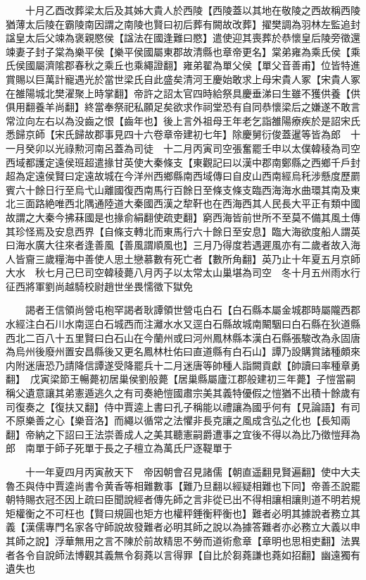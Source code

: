 　　十月乙酉改葬梁太后及其姊大貴人於西陵【西陵蓋以其地在敬陵之西故稱西陵猶薄太后陵在霸陵南因謂之南陵也賢曰初后葬有闕故改葬】擢樊調為羽林左監追封諡皇太后父竦為褒親愍侯【諡法在國逢難曰愍】遣使迎其喪葬於恭懷皇后陵旁徵還竦妻子封子棠為樂平侯【樂平侯國屬東郡故清縣也章帝更名】棠弟雍為乘氏侯【乘氏侯國屬濟隂郡春秋之乘丘也乘繩證翻】雍弟翟為單父侯【單父音善甫】位皆特進賞賜以巨萬計寵遇光於當世梁氏自此盛矣清河王慶始敢求上母宋貴人冢【宋貴人冢在雒陽城北樊濯聚上時掌翻】帝許之詔太官四時給祭具慶垂涕曰生雖不獲供養【供俱用翻養羊尚翻】終當奉祭祀私願足矣欲求作祠堂恐有自同恭懷梁后之嫌遂不敢言常泣向左右以為没齒之恨【齒年也】後上言外祖母王年老乞詣雒陽療疾於是詔宋氏悉歸京師【宋氏歸故郡事見四十六卷章帝建初七年】除慶舅衍俊蓋暹等皆為郎　十一月癸卯以光祿勲河南呂蓋為司徒　十二月丙寅司空張奮罷壬申以太僕韓稜為司空　西域都護定遠侯班超遣掾甘英使大秦條支【東觀記曰以漢中郡南鄭縣之西鄉千戶封超為定遠侯賢曰定遠故城在今洋州西鄉縣南西域傳曰自皮山西南經烏秅涉懸度歷罽賓六十餘日行至烏弋山離國復西南馬行百餘日至條支條支臨西海海水曲環其南及東北三面路絶唯西北隅通陸道大秦國西漢之犂靬也在西海西其人民長大平正有類中國故謂之大秦今拂菻國是也掾俞絹翻使疏吏翻】窮西海皆前世所不至莫不備其風土傳其珍怪焉及安息西界【自條支轉北而東馬行六十餘日至安息】臨大海欲度船人謂英曰海水廣大往來者逢善風【善風謂順風也】三月乃得度若遇遲風亦有二歲者故入海人皆齎三歲糧海中善使人思土戀慕數有死亡者【數所角翻】英乃止十年夏五月京師大水　秋七月己巳司空韓稜薨八月丙子以太常太山巢堪為司空　冬十月五州雨水行征西將軍劉尚越騎校尉趙世坐畏懦徵下獄免

　　謁者王信領尚營屯枹罕謁者耿譚領世營屯白石【白石縣本屬金城郡時屬隴西郡水經注白石川水南逕白石城西而注灕水水又逕白石縣故城南闞駰曰白石縣在狄道縣西北二百八十五里賢曰白石山在今蘭州或曰河州鳳林縣本漢白石縣張駿改為永固唐為烏州後廢州置安昌縣後又更名鳳林杜佑曰直道縣有白石山】譚乃設購賞諸種頗來内附迷唐恐乃請降信譚遂受降罷兵十二月迷唐等帥種人詣闕貢獻【帥讀曰率種章勇翻】　戊寅梁節王暢薨初居巢侯劉般薨【居巢縣屬廬江郡般建初三年薨】子愷當嗣稱父遺意讓其弟憲遁逃久之有司奏絶愷國肅宗美其義特優假之愷猶不出積十餘歲有司復奏之【復扶又翻】侍中賈逵上書曰孔子稱能以禮讓為國乎何有【見論語】有司不原樂善之心【樂音洛】而繩以循常之法懼非長克讓之風成含弘之化也【長知兩翻】帝納之下詔曰王法崇善成人之美其聽憲嗣爵遭事之宜後不得以為比乃徵愷拜為郎　南單于師子死單于長之子檀立為萬氏尸逐鞮單于

　　十一年夏四月丙寅赦天下　帝因朝會召見諸儒【朝直遥翻見賢遍翻】使中大夫魯丕與侍中賈逵尚書令黄香等相難數事【難乃旦翻以經疑相難也下同】帝善丕說罷朝特賜衣冠丕因上疏曰臣聞說經者傳先師之言非從已出不得相讓相讓則道不明若規矩權衡之不可枉也【賢曰規圓也矩方也權秤錘衡秤衡也】難者必明其據說者務立其義【漢儒專門名家各守師說故發難者必明其師之說以為據答難者亦必務立大義以申其師之說】浮華無用之言不陳於前故精思不勞而道術愈章【章明也思相吏翻】法異者各令自說師法博觀其義無令芻蕘以言得罪【自比於芻蕘謙也蕘如招翻】幽遠獨有遺失也

